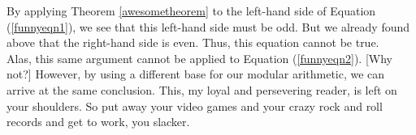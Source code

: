 By applying Theorem \ref{awesometheorem} to the left-hand side of
Equation (\ref{funnyeqn1}), we see that this left-hand side must
be odd. But we already found above that the right-hand side is even.
Thus, this equation cannot be true.\\

Alas, this same argument cannot be applied to Equation (\ref{funnyeqn2}).
[Why not?] However, by using a different base for our modular arithmetic,
we can arrive at the same conclusion. This, my loyal and persevering
reader, is left on your shoulders. So put away your video games and
your crazy rock and roll records and get to work, you slacker.
